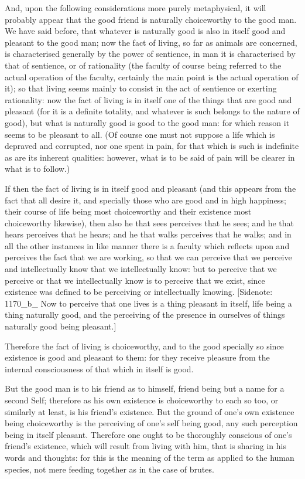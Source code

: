 And, upon the following considerations more purely metaphysical, it will
probably appear that the good friend is naturally choiceworthy to the
good man. We have said before, that whatever is naturally good is also
in itself good and pleasant to the good man; now the fact of living, so
far as animals are concerned, is characterised generally by the power
of sentience, in man it is characterised by that of sentience, or
of rationality (the faculty of course being referred to the actual
operation of the faculty, certainly the main point is the actual
operation of it); so that living seems mainly to consist in the act of
sentience or exerting rationality: now the fact of living is in itself
one of the things that are good and pleasant (for it is a definite
totality, and whatever is such belongs to the nature of good), but what
is naturally good is good to the good man: for which reason it seems
to be pleasant to all. (Of course one must not suppose a life which is
depraved and corrupted, nor one spent in pain, for that which is such is
indefinite as are its inherent qualities: however, what is to be said of
pain will be clearer in what is to follow.)

If then the fact of living is in itself good and pleasant (and this
appears from the fact that all desire it, and specially those who are
good and in high happiness; their course of life being most choiceworthy
and their existence most choiceworthy likewise), then also he that sees
perceives that he sees; and he that hears perceives that he hears; and
he that walks perceives that he walks; and in all the other instances
in like manner there is a faculty which reflects upon and perceives the
fact that we are working, so that we can perceive that we perceive and
intellectually know that we intellectually know: but to perceive that we
perceive or that we intellectually know is to perceive that we exist,
since existence was defined to be perceiving or intellectually knowing.
[Sidenote: 1170_b_ Now to perceive that one lives is a thing pleasant
in itself, life being a thing naturally good, and the perceiving of the
presence in ourselves of things naturally good being pleasant.]

Therefore the fact of living is choiceworthy, and to the good specially
so since existence is good and pleasant to them: for they receive
pleasure from the internal consciousness of that which in itself is
good.

But the good man is to his friend as to himself, friend being but a name
for a second Self; therefore as his own existence is choiceworthy to
each so too, or similarly at least, is his friend's existence. But the
ground of one's own existence being choiceworthy is the perceiving of
one's self being good, any such perception being in itself pleasant.
Therefore one ought to be thoroughly conscious of one's friend's
existence, which will result from living with him, that is sharing in
his words and thoughts: for this is the meaning of the term as applied
to the human species, not mere feeding together as in the case of
brutes.

